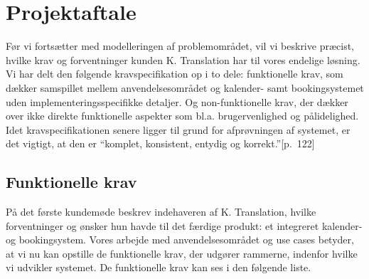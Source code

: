 \documentclass[12pt]{article}   %
\begin{document}
\section{Projektaftale}
Før vi fortsætter med modelleringen af problemområdet, vil vi beskrive præcist, hvilke krav og forventninger kunden K. Translation har til vores endelige løsning. Vi har delt den følgende kravspecifikation op i to dele: funktionelle krav, som dækker samspillet mellem anvendelsesområdet og
kalender- samt bookingsystemet uden implementeringsspecifikke detaljer. Og non-funktionelle krav, der dækker over ikke direkte funktionelle aspekter som bl.a. brugervenlighed og pålidelighed. Idet kravspecifikationen senere ligger
til grund for afprøvningen af systemet, er det vigtigt, at den er ``komplet, konsistent, entydig og korrekt.''\cite{oose}[p.~122] \\

\subsection{Funktionelle krav}
På det første kundemøde beskrev indehaveren af K. Translation, hvilke forventninger og ønsker hun havde til det færdige produkt: et integreret kalender- og bookingsystem. Vores arbejde med anvendelsesområdet og use cases betyder, at vi nu kan opstille de funktionelle krav, der udgører rammerne, indenfor hvilke vi udvikler systemet. De funktionelle krav kan ses i den følgende liste.\\
\end{document}
